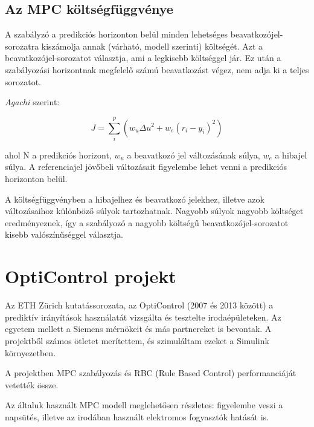 \subsection{Az MPC költségfüggvénye}


A szabályzó a predikciós horizonton belül minden lehetséges beavatkozójel-sorozatra kiszámolja annak (várható, modell szerinti) költségét. Azt a beavatkozójel-sorozatot választja, ami a legkisebb költséggel jár. Ez után a szabályozási horizontnak megfelelő számú beavatkozást végez, nem adja ki a teljes sorozatot. 

\textit{Agachi \cite{romanMPC_Agachi}} szerint:

\begin{equation} \label{eq_mpc_cost}
J = \sum_{i}^{p} \left(w_u \Delta u^2 + w_e (r_i-y_i)^2  \right)
\end{equation}

ahol N a predikciós horizont, $w_u$ a beavatkozó jel változásának súlya, $w_e$ a hibajel súlya. A referenciajel jövőbeli változásait figyelembe lehet venni a predikciós horizonton belül.

A költségfüggvényben a hibajelhez és beavatkozó jelekhez, illetve azok változásaihoz különböző súlyok tartozhatnak.
Nagyobb súlyok nagyobb költséget eredményeznek, így a szabályozó a nagyobb költségű beavatkozójel-sorozatot kisebb valószínűséggel választja.


\section{OptiControl projekt}
Az ETH Zürich kutatássorozata, az OptiControl \cite{Opticontrol-II} (2007 és 2013 között) a prediktív irányítások használatát vizsgálta és tesztelte irodaépületeken. Az egyetem mellett a Siemens mérnökeit és más partnereket is bevontak. A projektből számos ötletet merítettem, és szimuláltam ezeket a Simulink környezetben.


A projektben MPC szabályozás és RBC (Rule Based Control) performanciáját vetették össze.

Az általuk használt MPC modell meglehetősen részletes: figyelembe veszi a napsütés, illetve az irodában használt elektromos fogyasztók hatását is.


